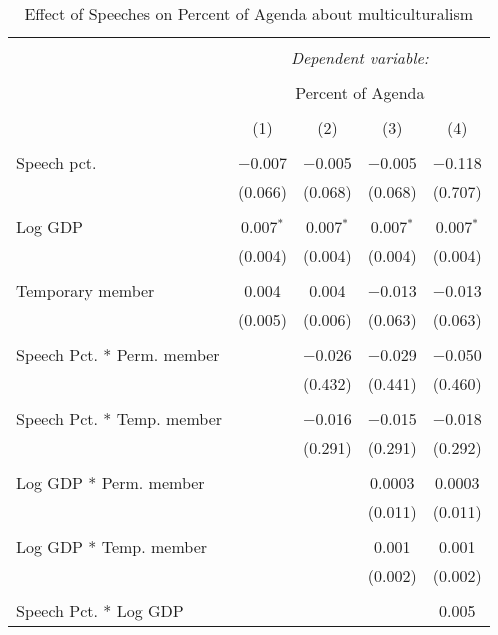 
\begin{table}[!htbp] \centering 
  \caption{Effect of Speeches on Percent of Agenda about  multiculturalism} 
  \label{} 
\begin{tabular}{@{\extracolsep{5pt}}lcccc} 
\\[-1.8ex]\hline 
\hline \\[-1.8ex] 
 & \multicolumn{4}{c}{\textit{Dependent variable:}} \\ 
\cline{2-5} 
\\[-1.8ex] & \multicolumn{4}{c}{Percent of Agenda} \\ 
\\[-1.8ex] & (1) & (2) & (3) & (4)\\ 
\hline \\[-1.8ex] 
 Speech pct. & $-$0.007 & $-$0.005 & $-$0.005 & $-$0.118 \\ 
  & (0.066) & (0.068) & (0.068) & (0.707) \\ 
  & & & & \\ 
 Log GDP & 0.007$^{*}$ & 0.007$^{*}$ & 0.007$^{*}$ & 0.007$^{*}$ \\ 
  & (0.004) & (0.004) & (0.004) & (0.004) \\ 
  & & & & \\ 
 Temporary member & 0.004 & 0.004 & $-$0.013 & $-$0.013 \\ 
  & (0.005) & (0.006) & (0.063) & (0.063) \\ 
  & & & & \\ 
 Speech Pct. * Perm. member &  & $-$0.026 & $-$0.029 & $-$0.050 \\ 
  &  & (0.432) & (0.441) & (0.460) \\ 
  & & & & \\ 
 Speech Pct. * Temp. member &  & $-$0.016 & $-$0.015 & $-$0.018 \\ 
  &  & (0.291) & (0.291) & (0.292) \\ 
  & & & & \\ 
 Log GDP * Perm. member &  &  & 0.0003 & 0.0003 \\ 
  &  &  & (0.011) & (0.011) \\ 
  & & & & \\ 
 Log GDP * Temp. member &  &  & 0.001 & 0.001 \\ 
  &  &  & (0.002) & (0.002) \\ 
  & & & & \\ 
 Speech Pct. * Log GDP &  &  &  & 0.005 \\ 

\end{tabular}
\end{table}
